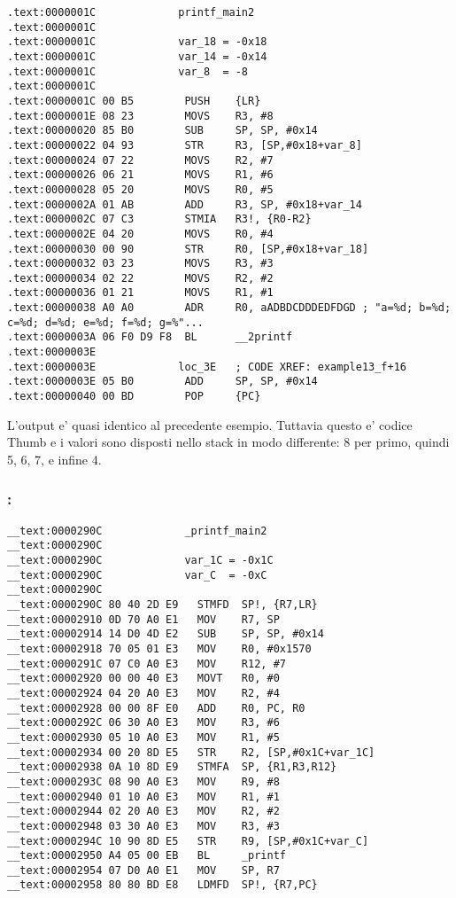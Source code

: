 \begin{lstlisting}
.text:0000001C             printf_main2
.text:0000001C
.text:0000001C             var_18 = -0x18
.text:0000001C             var_14 = -0x14
.text:0000001C             var_8  = -8
.text:0000001C
.text:0000001C 00 B5        PUSH    {LR}
.text:0000001E 08 23        MOVS    R3, #8
.text:00000020 85 B0        SUB     SP, SP, #0x14
.text:00000022 04 93        STR     R3, [SP,#0x18+var_8]
.text:00000024 07 22        MOVS    R2, #7
.text:00000026 06 21        MOVS    R1, #6
.text:00000028 05 20        MOVS    R0, #5
.text:0000002A 01 AB        ADD     R3, SP, #0x18+var_14
.text:0000002C 07 C3        STMIA   R3!, {R0-R2}
.text:0000002E 04 20        MOVS    R0, #4
.text:00000030 00 90        STR     R0, [SP,#0x18+var_18]
.text:00000032 03 23        MOVS    R3, #3
.text:00000034 02 22        MOVS    R2, #2
.text:00000036 01 21        MOVS    R1, #1
.text:00000038 A0 A0        ADR     R0, aADBDCDDDEDFDGD ; "a=%d; b=%d; c=%d; d=%d; e=%d; f=%d; g=%"...
.text:0000003A 06 F0 D9 F8  BL      __2printf
.text:0000003E
.text:0000003E             loc_3E   ; CODE XREF: example13_f+16
.text:0000003E 05 B0        ADD     SP, SP, #0x14
.text:00000040 00 BD        POP     {PC}
\end{lstlisting}

L'output e' quasi identico al precedente esempio. Tuttavia questo e' codice Thumb e i valori sono disposti nello stack in modo differente:
8 per primo, quindi 5, 6, 7, e infine 4.

\subsubsection{\OptimizingXcodeIV: \ARMMode}

\begin{lstlisting}
__text:0000290C             _printf_main2
__text:0000290C
__text:0000290C             var_1C = -0x1C
__text:0000290C             var_C  = -0xC
__text:0000290C
__text:0000290C 80 40 2D E9   STMFD  SP!, {R7,LR}
__text:00002910 0D 70 A0 E1   MOV    R7, SP
__text:00002914 14 D0 4D E2   SUB    SP, SP, #0x14
__text:00002918 70 05 01 E3   MOV    R0, #0x1570
__text:0000291C 07 C0 A0 E3   MOV    R12, #7
__text:00002920 00 00 40 E3   MOVT   R0, #0
__text:00002924 04 20 A0 E3   MOV    R2, #4
__text:00002928 00 00 8F E0   ADD    R0, PC, R0
__text:0000292C 06 30 A0 E3   MOV    R3, #6
__text:00002930 05 10 A0 E3   MOV    R1, #5
__text:00002934 00 20 8D E5   STR    R2, [SP,#0x1C+var_1C]
__text:00002938 0A 10 8D E9   STMFA  SP, {R1,R3,R12}
__text:0000293C 08 90 A0 E3   MOV    R9, #8
__text:00002940 01 10 A0 E3   MOV    R1, #1
__text:00002944 02 20 A0 E3   MOV    R2, #2
__text:00002948 03 30 A0 E3   MOV    R3, #3
__text:0000294C 10 90 8D E5   STR    R9, [SP,#0x1C+var_C]
__text:00002950 A4 05 00 EB   BL     _printf
__text:00002954 07 D0 A0 E1   MOV    SP, R7
__text:00002958 80 80 BD E8   LDMFD  SP!, {R7,PC}
\end{lstlisting}

